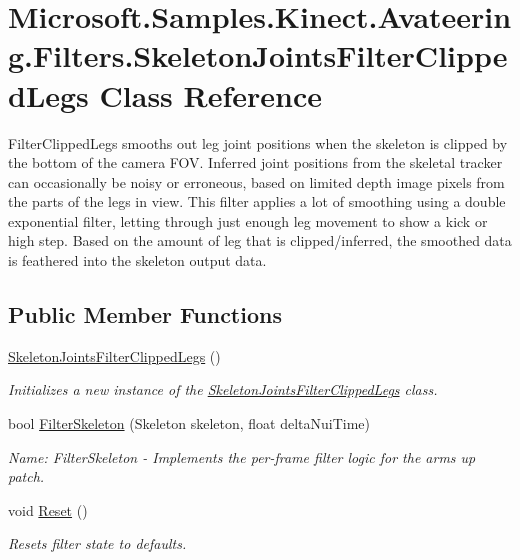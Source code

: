 \hypertarget{class_microsoft_1_1_samples_1_1_kinect_1_1_avateering_1_1_filters_1_1_skeleton_joints_filter_clipped_legs}{\section{Microsoft.\+Samples.\+Kinect.\+Avateering.\+Filters.\+Skeleton\+Joints\+Filter\+Clipped\+Legs Class Reference}
\label{class_microsoft_1_1_samples_1_1_kinect_1_1_avateering_1_1_filters_1_1_skeleton_joints_filter_clipped_legs}
}


Filter\+Clipped\+Legs smooths out leg joint positions when the skeleton is clipped by the bottom of the camera F\+O\+V. Inferred joint positions from the skeletal tracker can occasionally be noisy or erroneous, based on limited depth image pixels from the parts of the legs in view. This filter applies a lot of smoothing using a double exponential filter, letting through just enough leg movement to show a kick or high step. Based on the amount of leg that is clipped/inferred, the smoothed data is feathered into the skeleton output data.  


\subsection*{Public Member Functions}
\begin{DoxyCompactItemize}
\item 
\hyperlink{class_microsoft_1_1_samples_1_1_kinect_1_1_avateering_1_1_filters_1_1_skeleton_joints_filter_clipped_legs_aef24b15a7f5d3d1229711af10c1c16f2}{Skeleton\+Joints\+Filter\+Clipped\+Legs} ()
\begin{DoxyCompactList}\small\item\em Initializes a new instance of the \hyperlink{class_microsoft_1_1_samples_1_1_kinect_1_1_avateering_1_1_filters_1_1_skeleton_joints_filter_clipped_legs}{Skeleton\+Joints\+Filter\+Clipped\+Legs} class. \end{DoxyCompactList}\item 
bool \hyperlink{class_microsoft_1_1_samples_1_1_kinect_1_1_avateering_1_1_filters_1_1_skeleton_joints_filter_clipped_legs_ab895f4113df237008e3f8f734c0a2919}{Filter\+Skeleton} (Skeleton skeleton, float delta\+Nui\+Time)
\begin{DoxyCompactList}\small\item\em Name\+: Filter\+Skeleton -\/ Implements the per-\/frame filter logic for the arms up patch. \end{DoxyCompactList}\item 
void \hyperlink{class_microsoft_1_1_samples_1_1_kinect_1_1_avateering_1_1_filters_1_1_skeleton_joints_filter_clipped_legs_a97c249e8768e13c5efbf8c87f33c5fe2}{Reset} ()
\begin{DoxyCompactList}\small\item\em Resets filter state to defaults. \end{DoxyCompactList}\end{DoxyCompactItemize}



